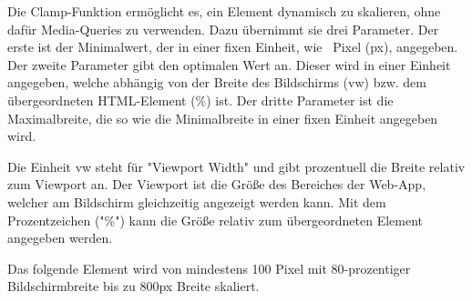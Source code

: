\label{sec:clamp}

Die Clamp-Funktion ermöglicht es, ein Element dynamisch zu skalieren, ohne dafür Media-Queries zu verwenden. 
Dazu übernimmt sie drei Parameter. Der erste ist der Minimalwert, der in einer fixen Einheit, wie \zb\ Pixel (px), angegeben. 
Der zweite Parameter gibt den optimalen Wert an. 
Dieser wird in einer Einheit angegeben, welche abhängig von der Breite des Bildschirms (vw) bzw. dem übergeordneten HTML-Element (\%) ist. 
Der dritte Parameter ist die Maximalbreite, die so wie die Minimalbreite in einer fixen Einheit angegeben wird. 

Die Einheit {\ttfamily vw} steht für "Viewport Width" und gibt prozentuell die Breite relativ zum Viewport an. Der Viewport ist die Größe des Bereiches der Web-App, welcher am Bildschirm gleichzeitig angezeigt werden kann. 
Mit dem Prozentzeichen ("{\ttfamily \%}") kann die Größe relativ zum übergeordneten Element angegeben werden.

Das folgende Element wird von mindestens 100 Pixel mit 80-prozentiger Bildschirmbreite bis zu 800px Breite skaliert.


